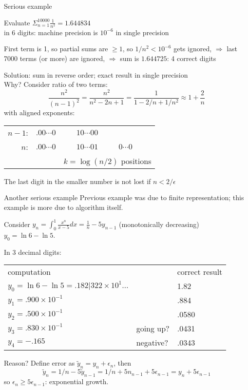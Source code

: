\begin{numberedframe}{Serious example}
  \small

Evaluate $\Sigma_{n=1}^{10000}\frac{1}{n^2}=1.644834$ \\
in 6 digits: machine precision is $10^{-6}$ in single precision

First term is 1, so partial sums are $\geq1$, so $1/n^2<10^{-6}$ gets
ignored,
$\Rightarrow$ last 7000 terms (or more) are ignored,
$\Rightarrow$ sum is $1.644725$: 4 correct digits

Solution: sum in reverse order; exact result in single precision\\
Why? Consider ratio of two terms:
\[ \frac{n^2}{(n-1)^2}=\frac{n^2}{n^2-2n+1}=\frac1{1-2/n+1/n^2}
    \approx 1+\frac2n
\]
with aligned exponents:\\
\begin{tabular}{rr|cl}
  $n-1$:&$.00\cdots0$&$10\cdots00$\\
  $n$:&  $.00\cdots0$&$10\cdots01$&$0\cdots0$\\
      &             &\multicolumn{2}{l}{$k=\log(n/2)$ positions}
\end{tabular}

The last digit in the smaller number is not lost if $n<2/\epsilon$
\end{numberedframe}

\begin{numberedframe}{Another serious example}
\small
Previous example was due to finite representation; this example is
more due to algorithm itself.

Consider $y_n=\int_0^1 \frac{x^n}{x-5}dx = \frac1n-5y_{n-1}$
(monotonically decreasing)\\
$y_0=\ln 6 - \ln 5$.

In 3 decimal digits:\\
\begin{tabular}{lll}
  computation&&correct result\\
  $y_0=\ln 6 - \ln 5=.182|322\times 10^{1}\ldots$&&1.82\\
  $y_1=.900\times 10^{-1}$&&.884\\
  $y_2=.500\times 10^{-1}$&&.0580\\
  $y_3=.830\times 10^{-1}$&going up?&.0431\\
  $y_4=-.165$&negative?&.0343
\end{tabular}

Reason? Define error as $\tilde y_n=y_n+\epsilon_n$, then
\[ \tilde y_n=1/n-5\tilde y_{n-1}=1/n+5n_{n-1}+5\epsilon_{n-1}
    = y_n+5\epsilon_{n-1} \]
so $\epsilon_n\geq 5\epsilon_{n-1}$: exponential growth.
\end{numberedframe}

